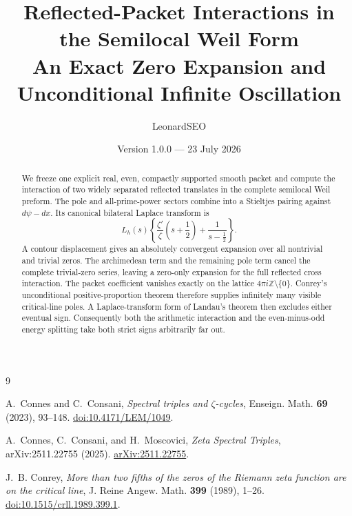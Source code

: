 \documentclass[11pt]{article}
\title{\textbf{Reflected-Packet Interactions in the Semilocal Weil Form}\\
\large An Exact Zero Expansion and Unconditional Infinite Oscillation}
\author{LeonardSEO}
\date{Version 1.0.0 --- 23 July 2026}
\theoremstyle{definition}
\newcommand{\Z}{\mathbb Z}
\begin{document}
\maketitle

\begin{abstract}
We freeze one explicit real, even, compactly supported smooth packet and
compute the interaction of two widely separated reflected translates in the
complete semilocal Weil preform.  The pole and all-prime-power sectors combine
into a Stieltjes pairing against \(d\psi-dx\).  Its canonical bilateral
Laplace transform is
\[
L_h(s)\left\{
\frac{\zeta'}{\zeta}\left(s+\frac12\right)
+\frac{1}{s-\frac12}
\right\}.
\]
A contour displacement gives an absolutely convergent expansion over all
nontrivial and trivial zeros.  The archimedean term and the remaining pole
term cancel the complete trivial-zero series, leaving a zero-only expansion
for the full reflected cross interaction.  The packet coefficient vanishes
exactly on the lattice \(4\pi i\Z\setminus\{0\}\).  Conrey's unconditional
positive-proportion theorem therefore supplies infinitely many visible
critical-line poles.  A Laplace-transform form of Landau's theorem then
excludes either eventual sign.  Consequently both the arithmetic interaction
and the even-minus-odd energy splitting take both strict signs arbitrarily
far out.
\end{abstract}

\begin{center}
\end{center}

\tableofcontents









\begin{thebibliography}{9}

A.~Connes and C.~Consani,
\emph{Spectral triples and \(\zeta\)-cycles},
Enseign. Math. \textbf{69} (2023), 93--148.
\href{https://doi.org/10.4171/LEM/1049}{doi:10.4171/LEM/1049}.

A.~Connes, C.~Consani, and H.~Moscovici,
\emph{Zeta Spectral Triples},
arXiv:2511.22755 (2025).
\href{https://arxiv.org/abs/2511.22755}{arXiv:2511.22755}.

J.~B. Conrey,
\emph{More than two fifths of the zeros of the Riemann zeta function
are on the critical line},
J. Reine Angew. Math. \textbf{399} (1989), 1--26.
\href{https://doi.org/10.1515/crll.1989.399.1}
{doi:10.1515/crll.1989.399.1}.

\end{thebibliography}
\end{document}
